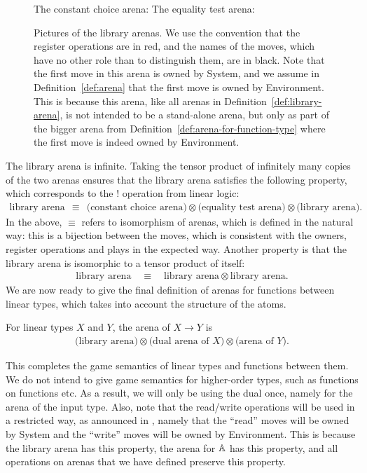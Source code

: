 \documentclass[a4paper,UKenglish,cleveref, autoref, numberwithinsect, thm-restate]{lipics-v2021}
\begin{document}
\begin{figure}
The constant choice arena:
The equality test arena:
\caption{\label{fig:library-arenas} Pictures of the library arenas.  We use the convention that the register operations are in red, and the names of the moves, which have no other role than to distinguish them, are in black. 
Note that the first move in this arena is owned by System, and we assume in Definition~\ref{def:arena} that the first move is owned by Environment. This is because this arena, like all arenas in Definition~\ref{def:library-arena}, is not intended to be a stand-alone arena, but only as part of the bigger arena from Definition~\ref{def:arena-for-function-type} where the first move is indeed owned by Environment. } 
\end{figure}
       
The library arena is infinite. Taking the tensor product of infinitely many copies of the two arenas ensures that the library arena satisfies the following property, which corresponds to the $!$ operation from linear logic: 
\begin{align}\label{eq:bang-library-arena}
\text{library arena} 
\ \  \equiv \ \  
\text{(constant choice arena)} \otimes 
\text{(equality test arena)} \otimes
 \text{(library arena)}.
\end{align}
In the above, $\equiv$ refers to isomorphism of arenas, which is defined in the natural way: this is a bijection between the moves, which is consistent with the owners, register operations and plays in the expected way.  Another property is that the library arena is isomorphic to a tensor product of itself: 
\begin{align}\label{eq:library-arena-isomorphism}
\text{library arena}
\quad \equiv \quad
\text{library arena} \otimes \text{library arena}.
\end{align}
We are now ready to give the final definition of arenas for functions between linear types, which takes into account the structure of the atoms.

\begin{definition}\label{def:arena-for-function-type} For linear types $X$ and $Y$, the arena of $X \to Y$ is 
    \begin{align*}
    \text{(library arena)} \otimes \text{(dual arena of $X$)} \otimes \text{(arena of $Y$)}.
    \end{align*}
\end{definition}
This completes the game semantics of linear types and functions between them. We do not intend to give game semantics for higher-order types, such as functions on functions etc. As a result, we will only be using the dual once, namely for the arena of the input type. Also, note that the read/write operations will be used in a restricted way, as announced in , namely that the ``read'' moves will be owned by System and the ``write'' moves will be owned by Environment.  This is because the library arena has this property, the arena for $\mathbb A$ has this property, and all operations on arenas that we have defined preserve this property.
\end{document}
